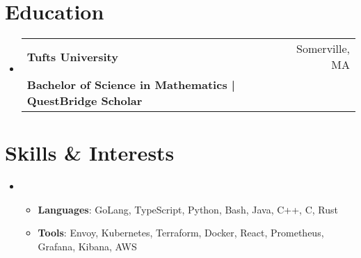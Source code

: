 \documentclass[letterpaper,11pt]{article}
\makeatletter
\newcommand{\cvitem}[1]{
  \item\small{
    {#1\vspace{-2pt}}
  }
}
\newcommand{\cvheading}[4]{
  \vspace{-2pt}\item
    \begin{tabular*}{\textwidth}[t]{l@{\extracolsep{\fill}}r}
      \textbf{#1} & #2 \\
      \small#3 & \small #4 \\
    \end{tabular*}\vspace{-9pt}
}
\newcommand{\cvheadingstart}{\begin{itemize}[leftmargin=0in, label={}]}
\newcommand{\cvheadingend}{\end{itemize}}
\newcommand{\cvitemstart}{\begin{itemize}\justifying}
\newcommand{\cvitemend}{\end{itemize}\vspace{-5pt}}
\makeatother
\begin{document}
\section{Education}
\cvheadingstart
  \cvheading
    {Tufts University}{Somerville, MA}
    {\textbf{Bachelor of Science in Mathematics | QuestBridge Scholar} }{}
\cvheadingend

\section{Skills \& Interests}
\cvheadingstart
\item
\cvitemstart
    \cvitem{\textbf{Languages}: GoLang, TypeScript, Python, Bash, Java, C++, C, Rust}
    \cvitem{\textbf{Tools}: Envoy, Kubernetes, Terraform, Docker, React, Prometheus, Grafana, Kibana, AWS}
\cvitemend
\cvheadingend
\end{document}
